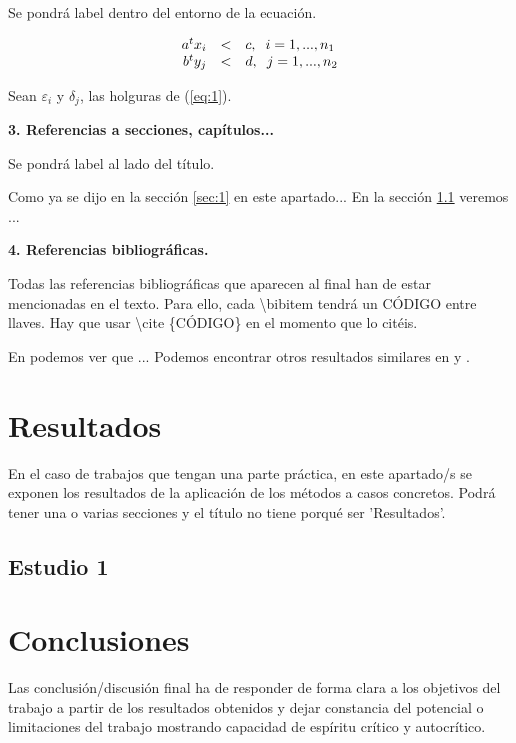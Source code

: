 \documentclass[12pt,twoside]{article}
\begin{document}
Se pondrá label dentro del entorno de la ecuación.

\begin{equation}
\begin{array}{rcl}
a^tx_i &<& c, \hspace{0.2cm} \tiny{i=1,...,n_1} \\
b^ty_j &<& d, \hspace{0.2cm} \tiny{j=1,...,n_2}
\end{array} \label{eq:1}
\end{equation}

Sean $\varepsilon_i$ y $\delta_j$, las holguras de (\ref{eq:1}).

\textbf{3. Referencias a secciones, capítulos...}

Se pondrá label al lado del título.

Como ya se dijo en la sección \ref{sec:1} en este apartado... En la sección \ref{sec:2} veremos ... 


\textbf{4. Referencias bibliográficas.}

Todas las referencias bibliográficas que aparecen al final han de estar mencionadas en el texto. Para ello, cada \textbackslash bibitem tendrá un CÓDIGO entre llaves. Hay que usar \textbackslash cite \{CÓDIGO\} en el momento que lo citéis.

En \cite{FA03} podemos ver que ... 
Podemos encontrar otros resultados similares en \cite{AR01} y \cite{CA01}.


\section{Resultados} 
{\color{red}
En el caso de trabajos que tengan una parte práctica, en este apartado/s se exponen los resultados de la aplicación de los métodos a casos concretos. Podrá tener una o varias secciones y el título no tiene porqué ser 'Resultados'.}
\subsection{Estudio 1} \label{sec:2}

\section{Conclusiones}
{\color{red}
Las conclusión/discusión final ha de responder de forma clara a los objetivos del trabajo a partir de los resultados obtenidos y dejar constancia del potencial o limitaciones del trabajo mostrando capacidad de espíritu crítico y autocrítico.}
\end{document}
